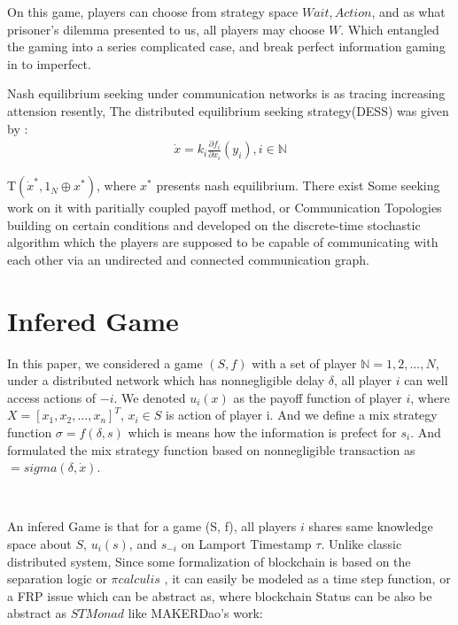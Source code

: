 \documentclass[twocolumn]{article}
\begin{document}
On this game, players can choose from strategy space ${Wait, Action}$, and as what prisoner's dilemma presented to us, all players may choose $W$. Which entangled the gaming into a series complicated case, and break perfect information gaming in to imperfect.


 Nash equilibrium seeking under communication networks is as tracing increasing attension resently, The distributed equilibrium seeking strategy(DESS) was given by \cite{7888532}:
\begin{gather}
  \dot{x} = k_i \frac {\partial f_i}{\partial x_i}(y_i), i \in \mathbb{N}
\end{gather}

T$(\dot{x}^*, 1_N\oplus x^*)$, where $x^*$ presents nash equilibrium. There exist Some seeking work on it with paritially coupled payoff method\cite{8029164}, or Communication Topologies\cite{8093754} building on certain conditions and developed on the discrete-time stochastic algorithm\cite{928588} which the players are supposed to be capable of communicating with each other via an undirected and connected communication graph\cite{7888532}. 

\section{Infered Game}

In this paper, we considered a game $(S, f)$ with a set of player $\mathbb{N} = {1, 2, ..., N}$, under a distributed network which has nonnegligible delay $\mathbb{\delta}$, all player $i$ can well access actions of $-i$. We denoted $u_i(x)$ as the payoff function of player $i$, where $X = [x_1, x_2, ..., x_n]^T$, $x_i \in S$ is action of player i. And we define a mix strategy function $\sigma = f(\delta, s)$ which is means how the information is prefect for $s_i$. And formulated the mix strategy function based on nonnegligible transaction as $=sigma(\delta, \dot{x})$.

\

An infered Game is that for a game (S, f), all players $i$ shares same knowledge space about $S$, $u_{i}(s)$, and $s_{-i}$ on  Lamport Timestamp $\tau$.
Unlike classic distributed system,
Since some formalization of blockchain is based on the separation logic or $\pi calculis$ \cite{linearblockchain}, it can easily be modeled as a time step function, or a FRP issue which can be abstract as\cite{ElliottHudak97:Fran}, where blockchain Status can be also be abstract as $STMonad$ like MAKERDao\cite{dai}'s work:
\end{document}
